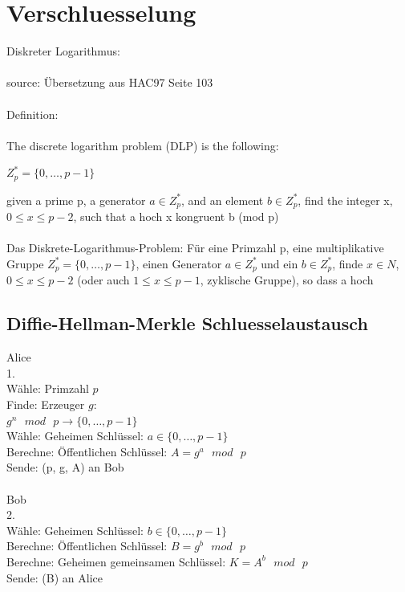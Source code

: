 \documentclass[
  a4paper,
  11pt,
]{article}
\title{}
\author{}
\begin{document}
\section*{Verschluesselung}
\label{sec:Verschluesselung}

Diskreter Logarithmus:
\\\\
source: Übersetzung aus HAC97 Seite 103
\\\\
Definition:
\\\\
The discrete logarithm problem (DLP) is the following:


$Z_p^* = \{ 0 ,\ldots , p - 1 \}$

given a prime p, a generator ${a\in Z_p^*}$, and an element ${b\in Z_p^*}$,
find the integer x, $0\leq x\leq p-2$, such that
a hoch x kongruent b (mod p)
\\\\
Das Diskrete-Logarithmus-Problem:
Für eine Primzahl p, eine multiplikative Gruppe $Z_p^* = \{ 0 ,\ldots , p - 1 \}$, einen Generator ${a\in Z_p^*}$ und ein ${b\in Z_p^*}$,
finde ${x\in N}$, $0\leq x\leq p-2$ (oder auch $1\leq x\le p-1$, zyklische Gruppe),
so dass a hoch %

\subsection*{Diffie-Hellman-Merkle Schluesselaustausch}
\label{sub:Diffie-Hellman-Merkle Schluesselaustausch}

	Alice\\
	1.\\
	Wähle:	Primzahl $p$\\
	Finde:	Erzeuger $g$:\\
			$g^n\text{ }mod\text{ }p \rightarrow \{ 0 ,\ldots , p - 1 \}$\\
	Wähle:	Geheimen Schlüssel: $a\in \{ 0 ,\ldots , p - 1 \}$\\
	Berechne:	Öffentlichen Schlüssel: $A=g^a\text{ }mod\text{ }p$\\
	Sende: (p, g, A) an Bob\\\\

	Bob\\
	2.\\
	Wähle:	Geheimen Schlüssel: $b\in \{ 0 ,\ldots , p - 1 \}$\\
	Berechne:	Öffentlichen Schlüssel: $B=g^b\text{ }mod\text{ }p$\\
	Berechne:	Geheimen gemeinsamen Schlüssel: $K=A^b\text{ }mod\text{ }p$\\
	Sende: (B) an Alice\\\\
	
\end{document}

